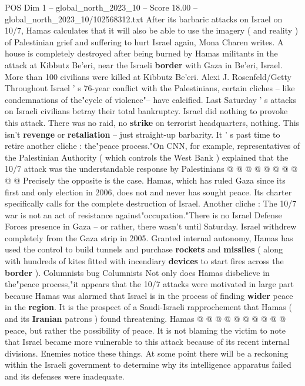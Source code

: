 \begin{textsample}{POS Dim 1 – global\_north\_2023\_10 – Score 18.00 – global\_north\_2023\_10/102568312.txt}  \label{ex:f1_pos_146}
After its barbaric attacks on Israel on 10/7, Hamas calculates that it will also be able to use the imagery ( and reality ) of Palestinian grief and suffering to hurt Israel again, Mona Charen writes.
A house is completely destroyed after being burned by Hamas militants in the attack at Kibbutz Be'eri, near the Israeli \textbf{border} with Gaza in Be'eri, Israel.
More than 100 civilians were killed at Kibbutz Be'eri.
Alexi J.
Rosenfeld/Getty Throughout Israel ' s 76-year conflict with the Palestinians, certain cliches -- like condemnations of the"cycle of violence"-- have calcified.
Last Saturday ' s attacks on Israeli civilians betray their total bankruptcy.
Israel did nothing to provoke this attack.
There was no raid, no \textbf{strike} on terrorist headquarters, nothing.
This isn't \textbf{revenge} or \textbf{retaliation} -- just straight-up barbarity.
It ' s past time to retire another cliche : the"peace process."On CNN, for example, representatives of the Palestinian Authority ( which controls the West Bank ) explained that the 10/7 attack was the understandable response by Palestinians @ @ @ @ @ @ @ @ @ @ Precisely the opposite is the case.
Hamas, which has ruled Gaza since its first and only election in 2006, does not and never has sought peace.
Its charter specifically calls for the complete destruction of Israel.
Another cliche : The 10/7 war is not an act of resistance against"occupation."There is no Israel Defense Forces presence in Gaza -- or rather, there wasn't until Saturday.
Israel withdrew completely from the Gaza strip in 2005.
Granted internal autonomy, Hamas has used the control to build tunnels and purchase \textbf{rockets} and \textbf{missiles} ( along with hundreds of kites fitted with incendiary \textbf{devices} to start fires across the \textbf{border} ).
Columnists bug Columnists Not only does Hamas disbelieve in the"peace process,"it appears that the 10/7 attacks were motivated in large part because Hamas was alarmed that Israel is in the process of finding \textbf{wider} peace in the \textbf{region}.
It is the prospect of a Saudi-Israeli rapprochement that Hamas ( and its \textbf{Iranian} patrons ) found threatening.
Hamas @ @ @ @ @ @ @ @ @ @ peace, but rather the possibility of peace.
It is not blaming the victim to note that Israel became more vulnerable to this attack because of its recent internal divisions.
Enemies notice these things.
At some point there will be a reckoning within the Israeli government to determine why its intelligence apparatus failed and its defenses were inadequate.

\end{textsample}
